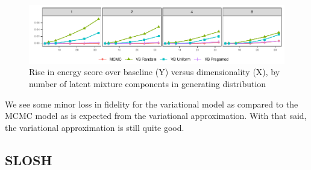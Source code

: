     \begin{figure}[ht]
        \centering
        \caption{Rise in energy score over baseline (Y) versus dimensionality (X),
            by number of latent mixture components in generating distribution
            \label{fig:energyscore}}
        \includegraphics{./plots/energy_score}
    \end{figure}
    
    We see some minor loss in fidelity for the variational model as compared to 
    the MCMC model as is expected from the variational approximation.  With that
    said, the variational approximation is still quite good.

\subsection{SLOSH}

